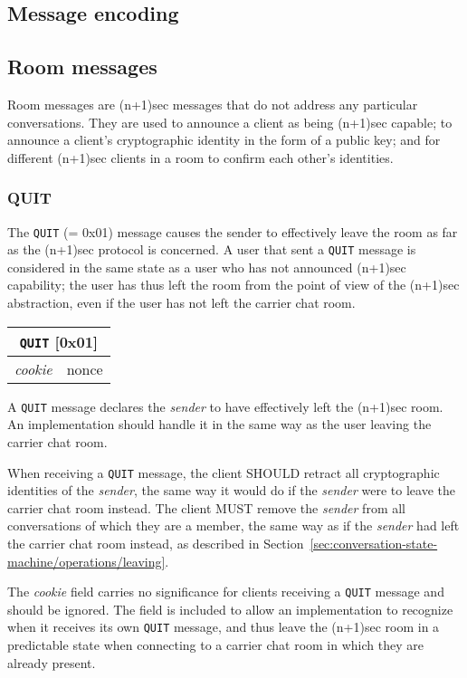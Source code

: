 \documentclass{article}
\def\message#1{\texttt{#1}}
\def\field#1{\textit{#1}}
\def\type#1{\textsf{#1}}
\newenvironment{basicmessage}[2]{
\newcommand{\messagefield}[2]{
\field{##1} & \type{##2} \\
\hline
}
\hspace{2em minus 2em}\begin{tabular}{|l|l|}
\hline
\multicolumn{2}{|c|}{\message{#1} [#2]} \\
\hline
\hline
}{
\end{tabular}
}
\begin{document}
\subsection{Message encoding}
\label{sec:messages/message-encoding}


\subsection{Room messages}
\label{sec:messages/room-messages}

Room messages are (n+1)sec messages that do not address any particular conversations.
They are used to announce a client as being (n+1)sec capable; to announce a client's cryptographic identity in the form of a public key; and for different (n+1)sec clients in a room to confirm each other's identities.


\subsubsection{QUIT}
\label{sec:messages/quit}

The \message{QUIT} (= 0x01) message causes the sender to effectively leave the room as far as the (n+1)sec protocol is concerned.
A user that sent a \message{QUIT} message is considered in the same state as a user who has not announced (n+1)sec capability; the user has thus left the room from the point of view of the (n+1)sec abstraction, even if the user has not left the carrier chat room.

\begin{basicmessage}{QUIT}{0x01}
\messagefield{cookie}{nonce}
\end{basicmessage}

A \message{QUIT} message declares the \field{sender} to have effectively left the (n+1)sec room.
An implementation should handle it in the same way as the user leaving the carrier chat room.

When receiving a \message{QUIT} message, the client SHOULD retract all cryptographic identities of the \field{sender}, the same way it would do if the \field{sender} were to leave the carrier chat room instead.
The client MUST remove the \field{sender} from all conversations of which they are a member, the same way as if the \field{sender} had left the carrier chat room instead, as described in Section~\ref{sec:conversation-state-machine/operations/leaving}.

The \field{cookie} field carries no significance for clients receiving a \message{QUIT} message and should be ignored.
The field is included to allow an implementation to recognize when it receives its own \message{QUIT} message, and thus leave the (n+1)sec room in a predictable state when connecting to a carrier chat room in which they are already present.
\end{document}
